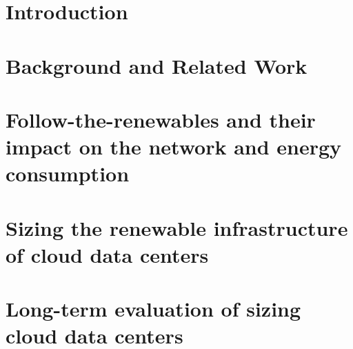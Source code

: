 
\chapter{Introduction} 
\label{chap:intro}





\chapter{Background and Related Work}
\label{chap:background}





\chapter[Follow-the-renewables and their impact on the  network and energy consumption]{Follow-the-renewables and their impact on the
  network and energy consumption}
\label{chap:smartgreens}





\chapter[Sizing the renewable infrastructure of cloud data centers]{Sizing the renewable infrastructure of cloud data centers}
\label{chap:ccgrid}







\chapter[Long term  evaluation of sizing cloud data centers]{Long-term  evaluation of sizing cloud data centers}
\label{chap:ccgrid-extension}


